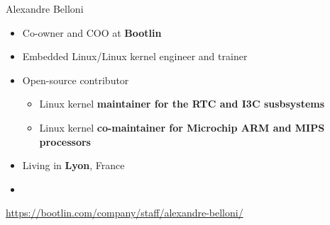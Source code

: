 \begin{frame}{Alexandre Belloni}
    \begin{itemize}
      \item Co-owner and COO at {\bf Bootlin}
      \item Embedded Linux/Linux kernel engineer and trainer
      \item Open-source contributor
        \begin{itemize}
          \item Linux kernel {\bf maintainer for the RTC and I3C susbsystems}
          \item Linux kernel {\bf co-maintainer for Microchip ARM and
            MIPS processors}
        \end{itemize}
      \item Living in {\bf Lyon}, France
      \item {}
    \end{itemize}
    {\small \url{https://bootlin.com/company/staff/alexandre-belloni/}}
\end{frame}

